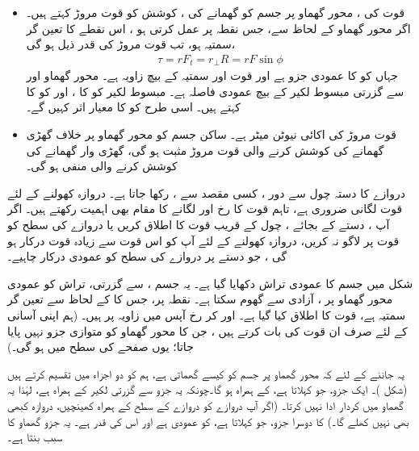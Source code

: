 \begin{itemize}
\item
 قوت  کی  ، محور گھماو پر  جسم کو گھمانے کی ، کوشش کو قوت مروڑ کہتے ہیں۔ اگر محور گھماو کے لحاظ سے،    جس نقطہ پر عمل کرتی ہو ، اس نقطے کا تعین گر سمتیہ  ہو،  تب قوت مروڑ کی قدر ذیل ہو گی،
 \begin{align*}
 \tau=rF_t=r_{\perp}R=rF\sin\phi
 \end{align*}
 جہاں  کو  کا عمودی جزو  ہے اور  قوت  اور سمتیہ  کے بیچ زاویہ ہے۔  محور گھماو اور   سے گزرتی مبسوط  لکیر   کے بیچ عمودی فاصلہ  ہے۔ مبسوط  لکیر  کو  کا  ، اور   کو  کا  کہتے ہیں۔ اسی طرح  کو  کا معیار اثر کہیں گے۔
 \item
 قوت مروڑ کی اکائی نیوٹن میٹر  ہے۔ ساکن جسم کو محور گھماو پر  خلاف گھڑی گھمانے کی کوشش کرنے والی قوت مروڑ   مثبت ہو گی، گھڑی وار گھمانے کی کوشش کرنے والی منفی ہو گی۔
 \end{itemize}
 
 دروازے کا دستہ    چول  سے دور  ، کسی مقصد سے ، رکھا جاتا ہے۔ دروازہ کھولنے کے لئے   قوت لگانی ضروری ہے، تاہم قوت کا رخ اور لگانے کا مقام بھی اہمیت رکھتے ہیں۔ اگر آپ ، دستے کے  بجائے ، چول کے قریب قوت کا اطلاق کریں یا دروازے کی سطح   کو قوت   پر  لاگو نہ کریں،  دروازہ کھولنے کے لئے  آپ کو اس قوت سے زیادہ قوت  درکار ہو گی ، جو دستے پر دروازے  کی سطح کو عمودی درکار چاہیے۔
 
 شکل  میں   جسم کا عمودی تراش دکھایا گیا ہے۔ یہ جسم ،  سے گزرتی،    تراش کو عمودی محور گھماو پر  ،    آزادی سے گھوم سکتا ہے۔ نقطہ  پر، جس کا    کے لحاظ سے تعین گر سمتیہ  ہے، قوت  کا اطلاق کیا گیا ہے۔   اور  کر رخ آپس میں زاویہ  پر ہیں۔ (ہم اپنی آسانی کے لئے صرف ان  قوت کی بات کرتے ہیں  ، جن کا  محور گھماو کو متوازی جزو نہیں پایا جاتا؛ یوں  صفحے کی سطح میں ہو گی۔)
 
 یہ جاننے کے لئے کہ محور گھماو پر   جسم کو کیسے گھماتی ہے، ہم  کو دو اجزاء میں تقسیم کرتے ہیں (شکل )۔ ایک جزو، جو     کہلاتا ہے،  کے ہمراہ ہو گا۔چونکہ  یہ جزو   سے گزرتی لکیر  کے ہمراہ ہے، لہٰذا  یہ گھماو  میں کردار ادا نہیں کرتا۔ (اگر آپ دروازے کو دروازے کے سطح کے ہمراہ  کھینچیں، دروازہ کبھی بھی نہیں کھلے گا۔)   کا دوسرا جزو، جو  کہلاتا ہے،  کو عمودی ہے اور اس کی قدر  ہے۔ یہ جزو گھماو کا سبب بنتا ہے۔
 
